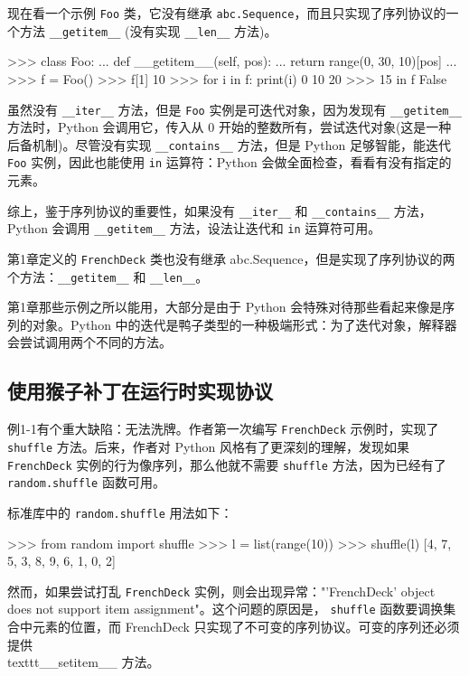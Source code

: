 现在看一个示例 \texttt{Foo} 类，它没有继承 \texttt{abc.Sequence}，而且只实现了序列协议的一个方法 \texttt{\_\_getitem\_\_} (没有实现 \texttt{\_\_len\_\_} 方法)。

\begin{python}
>>> class Foo:
...     def __getitem__(self, pos):
...         return range(0, 30, 10)[pos]
... 
>>> f = Foo()
>>> f[1]
10
>>> for i in f: print(i)
0
10
20
>>> 15 in f
False
\end{python}

虽然没有 \texttt{\_\_iter\_\_} 方法，但是 \texttt{Foo} 实例是可迭代对象，因为发现有 \texttt{\_\_getitem\_\_} 方法时，Python 会调用它，传入从 0 开始的整数所有，尝试迭代对象(这是一种后备机制)。尽管没有实现  \texttt{\_\_contains\_\_} 方法，但是 Python 足够智能，能迭代 \texttt{Foo} 实例，因此也能使用 \texttt{in} 运算符：Python 会做全面检查，看看有没有指定的元素。

综上，鉴于序列协议的重要性，如果没有 \texttt{\_\_iter\_\_} 和 \texttt{\_\_contains\_\_} 方法，Python 会调用 \texttt{\_\_getitem\_\_} 方法，设法让迭代和 \texttt{in} 运算符可用。

第1章定义的 \texttt{FrenchDeck} 类也没有继承 abc.Sequence，但是实现了序列协议的两个方法：\texttt{\_\_getitem\_\_} 和 \texttt{\_\_len\_\_}。



第1章那些示例之所以能用，大部分是由于 Python 会特殊对待那些看起来像是序列的对象。Python 中的迭代是鸭子类型的一种极端形式：为了迭代对象，解释器会尝试调用两个不同的方法。

\subsection{使用猴子补丁在运行时实现协议}

例1-1有个重大缺陷：无法洗牌。作者第一次编写 \texttt{FrenchDeck} 示例时，实现了 \texttt{shuffle} 方法。后来，作者对 Python 风格有了更深刻的理解，发现如果 \texttt{FrenchDeck} 实例的行为像序列，那么他就不需要 \texttt{shuffle} 方法，因为已经有了 \texttt{random.shuffle} 函数可用。

标准库中的 \texttt{random.shuffle} 用法如下：

\begin{python}
>>> from random import shuffle
>>> l = list(range(10))
>>> shuffle(l)
[4, 7, 5, 3, 8, 9, 6, 1, 0, 2]
\end{python}

然而，如果尝试打乱 \texttt{FrenchDeck} 实例，则会出现异常："'FrenchDeck' object does not support item assignment"。这个问题的原因是， \texttt{shuffle} 函数要调换集合中元素的位置，而 FrenchDeck 只实现了不可变的序列协议。可变的序列还必须提供 \\texttt{\_\_setitem\_\_} 方法。

